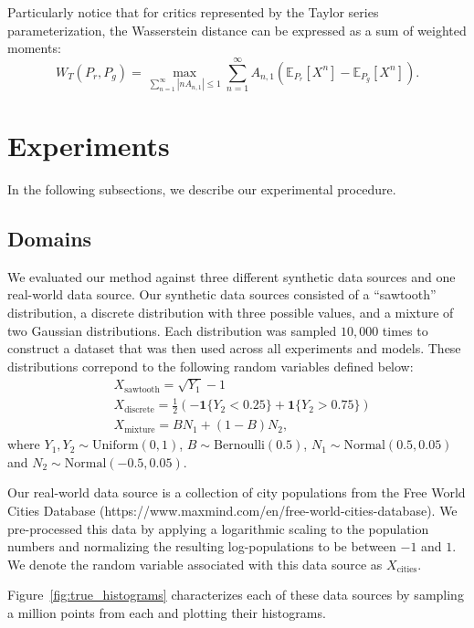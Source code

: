 \documentclass[letterpaper]{article} %
\begin{document}
Particularly notice that for critics represented by the Taylor series parameterization, the Wasserstein distance can be expressed as a sum of weighted moments:
\begin{equation}
W_T(P_r, P_g) = \max_{\sum_{n=1}^\infty |n A_{n,1}| \leq 1} \sum_{n=1}^\infty A_{n,1}\left(\mathbb{E}_{P_r}\left[ X^n \right] - \mathbb{E}_{P_g} \left[ X^n \right]\right).
\end{equation}

\section{Experiments}
In the following subsections, we describe our experimental procedure.
\subsection{Domains}
We evaluated our method against three different synthetic data sources and one real-world data source. Our synthetic data sources consisted of a ``sawtooth'' distribution, a discrete distribution with three possible values, and a mixture of two Gaussian distributions. Each distribution was sampled $10,000$ times to construct a dataset that was then used across all experiments and models.  These distributions correpond to the following random variables defined below:
\begin{equation}
\begin{aligned}
&X_\text{sawtooth} = \sqrt{Y_1} - 1\\
&X_\text{discrete} = \frac{1}{2}\left(-\boldsymbol{1}\{ Y_2 < 0.25\} + \boldsymbol{1}\{Y_2 > 0.75\}\right)\\
&X_\text{mixture} = B N_1 + (1 - B) N_2,
\end{aligned}
\end{equation}
where $Y_1, Y_2 \sim \text{Uniform}(0, 1)$, $B \sim \text{Bernoulli}(0.5)$, $N_1 \sim \text{Normal}(0.5, 0.05)$ and $N_2 \sim \text{Normal}(-0.5, 0.05)$.

Our real-world data source is a collection of city populations from the Free World Cities Database (https://www.maxmind.com/en/free-world-cities-database). We pre-processed this data by applying a logarithmic scaling to the population numbers and normalizing the resulting log-populations to be between $-1$ and $1$. We denote the random variable associated with this data source as $X_\text{cities}$.

Figure~\ref{fig:true_histograms} characterizes each of these data sources by sampling a million points from each and plotting their histograms.
\end{document}
